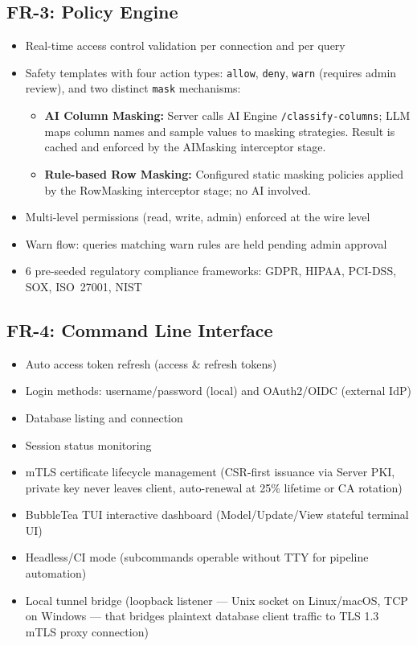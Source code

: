 \subsection{FR-3: Policy Engine}
\begin{itemize}
    \item Real-time access control validation per connection and per query
    \item Safety templates with four action types: \texttt{allow}, \texttt{deny}, \texttt{warn} (requires admin review), and two distinct \texttt{mask} mechanisms:
    \begin{itemize}
        \item \textbf{AI Column Masking:} Server calls AI Engine \texttt{/classify-columns}; LLM maps column names and sample values to masking strategies. Result is cached and enforced by the AIMasking interceptor stage.
        \item \textbf{Rule-based Row Masking:} Configured static masking policies applied by the RowMasking interceptor stage; no AI involved.
    \end{itemize}
    \item Multi-level permissions (read, write, admin) enforced at the wire level
    \item Warn flow: queries matching warn rules are held pending admin approval
    \item 6 pre-seeded regulatory compliance frameworks: GDPR, HIPAA, PCI-DSS, SOX, ISO~27001, NIST
\end{itemize}

\subsection{FR-4: Command Line Interface}
\begin{itemize}
    \item Auto access token refresh (access \& refresh tokens)
    \item Login methods: username/password (local) and OAuth2/OIDC (external IdP)
    \item Database listing and connection
    \item Session status monitoring
    \item mTLS certificate lifecycle management (CSR-first issuance via Server PKI, private key never leaves client, auto-renewal at 25\% lifetime or CA rotation)
    \item BubbleTea TUI interactive dashboard (Model/Update/View stateful terminal UI)
    \item Headless/CI mode (subcommands operable without TTY for pipeline automation)
    \item Local tunnel bridge (loopback listener — Unix socket on Linux/macOS, TCP on Windows — that bridges plaintext database client traffic to TLS 1.3 mTLS proxy connection)
\end{itemize}

